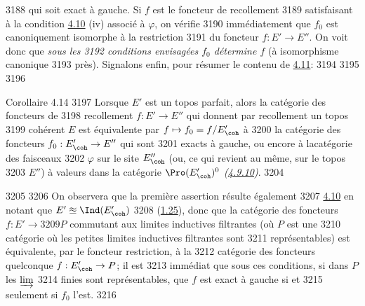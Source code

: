   3188	qui soit exact à gauche. Si $f$ est le foncteur de recollement
  3189	satisfaisant à la condition \hyperref[VI.prop4.10]{4.10} (iv) associé à $\varphi$, on vérifie
  3190	immédiatement que $f_0$ est canoniquement isomorphe à la restriction
  3191	du foncteur $f : E'\to E''$. On voit donc que \emph{sous les
  3192	  conditions envisagées $f_0$ détermine $f$} (à isomorphisme canonique
  3193	près). Signalons enfin, pour résumer le contenu de \hyperref[VI.cor4.11]{4.11}:
  3194	
  3195	
  3196	\begin{enonce*}{Corollaire 4.14}
  3197	Lorsque $E'$ est un topos parfait, alors la catégorie des foncteurs de
  3198	recollement $f : E'\to E''$ qui donnent par recollement un topos
  3199	cohérent $E$ est équivalente par $f \mapsto f_0 = f / E'_{\coh}$ à
  3200	la catégorie des foncteurs $f_0 : E'_{\coh} \to E''$ qui sont
  3201	exacts à gauche, ou encore à la\pageoriginale catégorie des faisceaux
  3202	$\varphi$ sur le site $E''_{\coh}$ (ou, ce qui revient au même, sur le topos
  3203	$E''$) à valeurs dans la catégorie $\Pro(E'_{\coh})^0$ \emph{(\cf \hyperref[VI.subsubsec4.9.10]{4.9.10})}.
  3204	\end{enonce*}
  3205	
  3206	On observera que la première assertion résulte également
  3207	\hyperref[VI.prop4.10]{4.10} en notant que $E' \approxeq \Ind (E'_{\coh})$
  3208	(\hyperref[VI.cor1.25]{1.25}), donc que la catégorie des foncteurs $f : E'\to
  3209	P$ commutant aux limites inductives filtrantes (où $P$ est une
  3210	catégorie où les petites limites inductives filtrantes sont
  3211	représentables) est équivalente, par le foncteur restriction, à la
  3212	catégorie des foncteurs quelconque $f : E'_{\coh} \to P$; il est
  3213	immédiat que sous ces conditions, si dans $P$ les $\varinjlim$
  3214	finies sont représentables, que $f$ est exact à gauche si et
  3215	seulement si $f_0$ l'est.
  3216	

